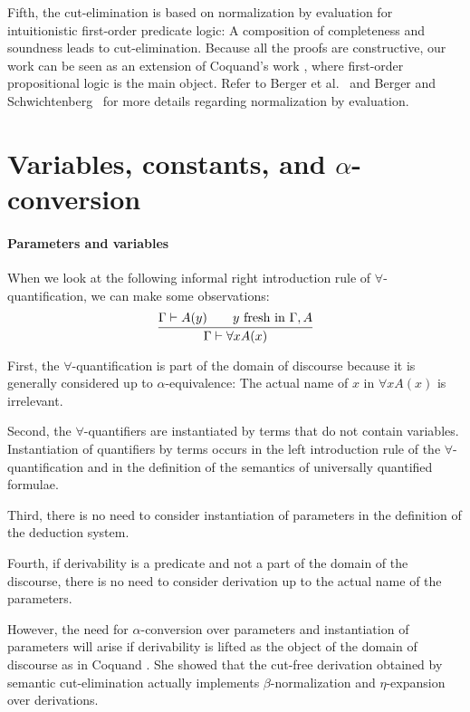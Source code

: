 \documentclass{svjour3}                     %
\newcommand{\seq}[2]{\infer{#2}{#1}}
\begin{document}
Fifth, the cut-elimination is based on normalization by evaluation for intuitionistic first-order predicate logic: A composition of completeness and soundness leads to cut-elimination. Because all the proofs are constructive, our work can be seen as an extension of Coquand's work \cite{cCoquand93,cCoquand02}, where first-order propositional logic is the main object. Refer to Berger et al.~\cite{nbe98} and Berger and Schwichtenberg~\cite{nbe} for more details regarding normalization by evaluation.



\section{Variables, constants, and $\alpha$-conversion}\label{representation}

\paragraph{Parameters and variables}\label{representation}
When we look at the following informal right introduction rule of $\forall$-quantification, we can make some observations:
\[
\seq{\Gamma \vdash A(y) \qquad \mbox{$y$ fresh in $\Gamma, A$}}
    {\Gamma \vdash \forall x A(x)}
\]

First, the $\forall$-quantification is part of the domain of
discourse because it is generally considered up to $\alpha$-equivalence:
The actual name of $x$ in $\forall x A(x)$ is irrelevant.

Second, the $\forall$-quantifiers are instantiated by terms that do not
contain variables. Instantiation of quantifiers by
terms occurs in the left introduction rule of the 
$\forall$-quantification and in the definition of the semantics of universally quantified formulae.

Third, there is no need to consider instantiation of parameters in the definition of the deduction system.

Fourth, if derivability is a predicate and not a part of the domain of the discourse, there is no need to consider derivation up to the actual name of the parameters.

However, the need for $\alpha$-conversion over parameters and instantiation of parameters will arise if derivability is lifted as the object of the domain of discourse as in Coquand \cite{cCoquand93,cCoquand02}. She showed that the cut-free derivation obtained by semantic cut-elimination actually implements $\beta$-normalization and $\eta$-expansion over derivations.
\end{document}
